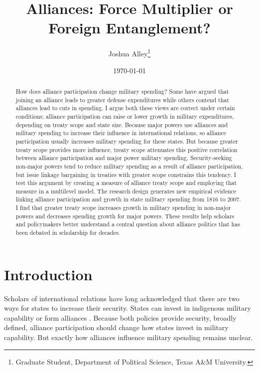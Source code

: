 \documentclass[12pt]{article}
\title{\textbf{Alliances: Force Multiplier or Foreign Entanglement?}}
\author{Joshua Alley\footnote{Graduate Student,
Department of Political Science, Texas A\&M University.}}
\date{{\normalsize \today}}
\begin{document}
\maketitle 

\newpage 

\doublespace 

\begin{abstract}
How does alliance participation change military spending? 
Some have argued that joining an alliance leads to greater defense expenditures while others contend that alliances lead to cuts in spending.
I argue both these views are correct under certain conditions; alliance participation can raise or lower growth in military expenditures, depending on treaty scope and state size. 
Because major powers use alliances and military spending to increase their influence in international relations, so alliance participation usually increases military spending for these states. 
But because greater treaty scope provides more influence, treaty scope attenuates this positive correlation between alliance participation and major power military spending. 
Security-seeking non-major powers tend to reduce military spending as a result of alliance participation, but issue linkage bargaining in treaties with greater scope constrains this tendency. 
I test this argument by creating a measure of alliance treaty scope and employing that measure in a multilevel model. 
The research design generates new empirical evidence linking alliance participation and growth in state military spending from 1816 to 2007. 
I find that greater treaty scope increases growth in military spending in non-major powers and decreases spending growth for major powers.  
These results help scholars and policymakers better understand a central question about alliance politics that has been debated in scholarship for decades. 
\end{abstract}



\section{Introduction}


Scholars of international relations have long acknowledged that there are two ways for states to increase their security. 
States can invest in indigenous military capability or form alliances \citep{Morgenthau1948, Morrow1993}.
Because both policies provide security, broadly defined, alliance participation should change how states invest in military capability. 
But exactly how alliances influence military spending remains unclear. 
\end{document}
